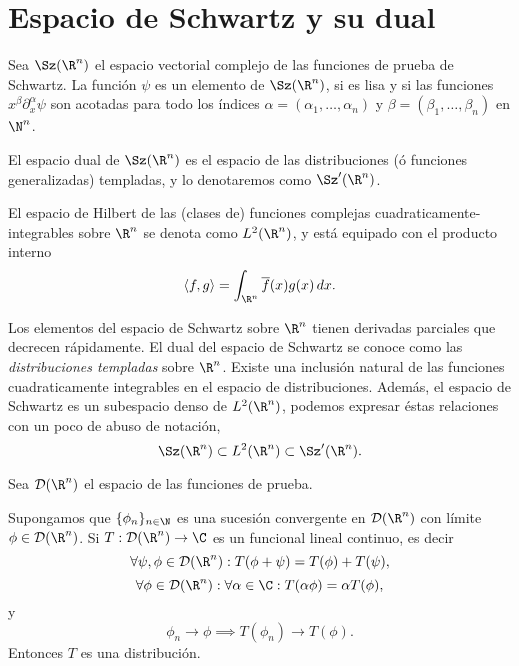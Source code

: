   \section{Espacio de Schwartz y su dual}

  \begin{definition}
    Sea $\Sz(\R^{n})$ el espacio vectorial complejo
    de las funciones de prueba de Schwartz. La función
    $\psi$ es un elemento de $\Sz(\R^{n})$, si es
    lisa y si las funciones $x^{\beta} \partial_x^{\alpha}
    \psi$ son acotadas para todo los índices $\alpha =
    (\alpha_1, \ldots, \alpha_n)$ y $\beta = (\beta_1,
    \ldots, \beta_n)$ en $\N^{n}$.
  \end{definition}

  \begin{definition}
    El espacio dual de $\Sz(\R^{n})$ es el espacio de
    las distribuciones (ó funciones generalizadas)
    templadas, y lo denotaremos como $\Sz'(\R^{n})$.
  \end{definition}

  \begin{definition}
    El espacio de Hilbert de las (clases de) funciones
    complejas cuadraticamente-integrables sobre $\R^{n}$ se
    denota como $L^2(\R^{n})$, y está equipado con el
    producto interno
    \[
      \langle f, g \rangle
      = \int_{\R^{n}} \overline{f}(x) g(x) \, dx.
    \] 
  \end{definition}
 
  Los elementos del espacio de Schwartz sobre $\R^{n}$
  tienen derivadas parciales que decrecen rápidamente. El
  dual del espacio de Schwartz se conoce como las
  \textit{distribuciones templadas} sobre $\R^{n}$. Existe
  una inclusión natural de las funciones cuadraticamente
  integrables en el espacio de distribuciones. Además, el
  espacio de Schwartz es un subespacio denso de
  $L^2(\R^{n})$, podemos expresar éstas relaciones con un
  poco de abuso de notación,
  \[
    \Sz(\R^{n})
    \subset L^2(\R^{n})
    \subset \Sz'(\R^{n}).
  \]

  Sea $\mathcal D(\R^{n})$ el espacio de las funciones de
  prueba.

  \begin{definition}
    Supongamos que $\{\phi_n\}_{n \in \N}$ es una sucesión
    convergente en $\mathcal D(\R^{n})$ con límite $\phi \in
    \mathcal D(\R^{n})$. Si $T : \mathcal D(\R^{n}) \to \C$
    es un funcional lineal continuo, es decir
    \[
      \forall \psi, \phi \in \mathcal D(\R^{n}) : T(\phi +
      \psi) = T(\phi) + T(\psi),
    \] 
    \[
      \forall \phi \in \mathcal D(\R^{n}) : \forall \alpha
      \in \C : T(\alpha \phi) = \alpha T(\phi),
    \] 
    y
    \[
      \phi_n \to \phi \implies T(\phi_n) \to T(\phi).
    \] 
    Entonces $T$ es una distribución.
  \end{definition}

